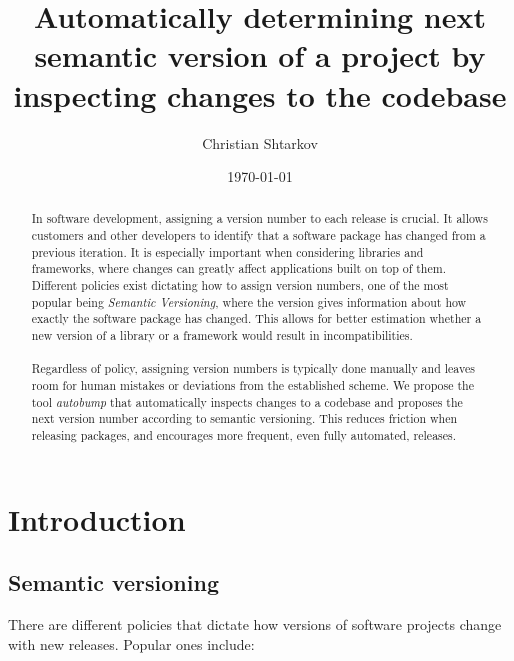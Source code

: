 \documentclass{l4proj}
\begin{document}
\title{Automatically determining next semantic version of a project by \\
inspecting changes to the codebase}
\author{Christian Shtarkov}
\date{\today}
\maketitle

\begin{abstract}
In software development, assigning a version number
to each release is crucial. It allows customers and other developers
to identify that a software package has changed from a previous
iteration. It is especially important when considering libraries and
frameworks, where changes can greatly affect applications built on top
of them. \\ Different policies exist dictating how to assign version
numbers, one of the most popular being \textit{Semantic
Versioning}\cite{SemanticVersioning}, where the version gives
information about how exactly the software package has changed. This
allows for better estimation whether a new version of a library or a
framework would result in incompatibilities.
\\\\
Regardless of
policy, assigning version numbers is typically done manually and
leaves room for human mistakes or deviations from the established
scheme. We propose the tool \textit{autobump} that automatically
inspects changes to a codebase and proposes the next version number
according to semantic versioning. This reduces friction when releasing
packages, and encourages more frequent, even fully automated,
releases.
\end{abstract}

\educationalconsent

\tableofcontents

\chapter{Introduction}

\section{Semantic versioning}

There are different policies that dictate how versions of software
projects change with new releases. Popular ones include:
\end{document}

